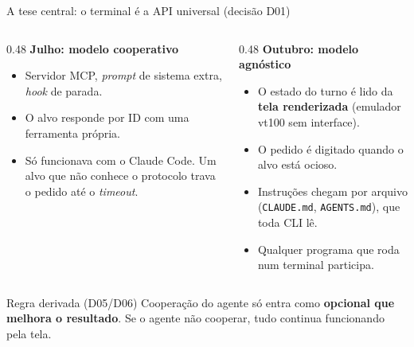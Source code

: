 \documentclass[11pt,aspectratio=169]{beamer}
\begin{document}
\begin{frame}{A tese central: o terminal é a API universal (decisão D01)}
\begin{columns}[T]
\begin{column}{0.48\linewidth}
\textbf{Julho: modelo cooperativo}
\begin{itemize}\small
\item Servidor MCP, \emph{prompt} de sistema extra, \emph{hook} de parada.
\item O alvo responde por ID com uma ferramenta própria.
\item \textcolor{ruim}{Só funcionava com o Claude Code.} Um alvo que não conhece o protocolo trava o pedido até o \emph{timeout}.
\end{itemize}
\end{column}
\begin{column}{0.48\linewidth}
\textbf{Outubro: modelo agnóstico}
\begin{itemize}\small
\item O estado do turno é lido da \textbf{tela renderizada} (emulador vt100 sem interface).
\item O pedido é digitado quando o alvo está ocioso.
\item Instruções chegam por arquivo (\texttt{CLAUDE.md}, \texttt{AGENTS.md}), que toda CLI lê.
\item \textcolor{ok}{Qualquer programa que roda num terminal participa.}
\end{itemize}
\end{column}
\end{columns}
\vspace{0.8em}
\begin{block}{Regra derivada (D05/D06)}
Cooperação do agente só entra como \textbf{opcional que melhora o resultado}. Se o agente não cooperar, tudo
continua funcionando pela tela.
\end{block}
\end{frame}
\end{document}
